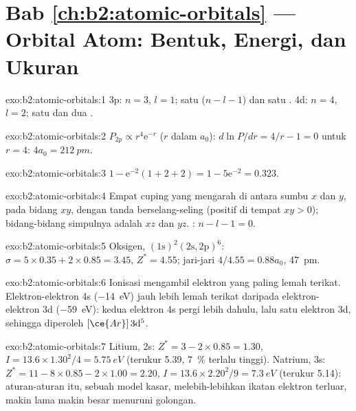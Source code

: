 \section*{Bab \ref{ch:b2:atomic-orbitals} --- Orbital Atom: Bentuk, Energi, dan Ukuran}

\begin{solution}{exo:b2:atomic-orbitals:1}
3p: $n = 3$, $l = 1$; satu  ($n - l - 1$) dan satu . 4d: $n = 4$, $l = 2$; satu  dan dua .
\end{solution}

\begin{solution}{exo:b2:atomic-orbitals:2}
$P_{2p} \propto r^4\mathrm e^{-r}$ ($r$ dalam $a_0$): $d\ln P/dr = 4/r - 1 = 0$
untuk $r = 4$: $4a_0 = \qty{212}{pm}$.
\end{solution}

\begin{solution}{exo:b2:atomic-orbitals:3}
$1 - \mathrm e^{-2}(1 + 2 + 2) = 1 - 5\mathrm e^{-2} = 0.323$.
\end{solution}

\begin{solution}{exo:b2:atomic-orbitals:4}
Empat cuping yang mengarah di antara sumbu $x$ dan $y$, pada bidang $xy$,
dengan tanda berselang-seling (positif di tempat $xy > 0$); bidang-bidang
simpulnya adalah $xz$ dan $yz$. : $n - l - 1 = 0$.
\end{solution}

\begin{solution}{exo:b2:atomic-orbitals:5}
Oksigen, $(1\mathrm s)^2(2\mathrm s, 2\mathrm p)^6$: $\sigma = 5 \times 0.35 + 2 \times 0.85
= 3.45$, $Z^* = 4.55$; jari-jari $4/4.55 = 0.88a_0$, \qty{47}{pm}.
\end{solution}

\begin{solution}{exo:b2:atomic-orbitals:6}
Ionisasi mengambil elektron yang paling lemah terikat. Elektron-elektron
4s (\qty{-14}{eV}) jauh lebih lemah terikat daripada elektron-elektron 3d
(\qty{-59}{eV}): kedua elektron 4s pergi lebih dahulu, lalu satu elektron
3d, sehingga diperoleh $[\ce{Ar}]\,3\mathrm d^5$.
\end{solution}

\begin{solution}{exo:b2:atomic-orbitals:7}
Litium, 2s: $Z^* = 3 - 2 \times 0.85 = 1.30$, $I = 13.6 \times 1.30^2/4 =
\qty{5.75}{eV}$ (terukur 5.39, 7~\% terlalu tinggi). Natrium, 3s:
$Z^* = 11 - 8 \times 0.85 -
2 \times 1.00 = 2.20$,
$I = 13.6 \times 2.20^2/9 = \qty{7.3}{eV}$ (terukur 5.14): aturan-aturan
itu, sebuah model kasar, melebih-lebihkan ikatan elektron terluar, makin
lama makin besar menuruni golongan.
\end{solution}

